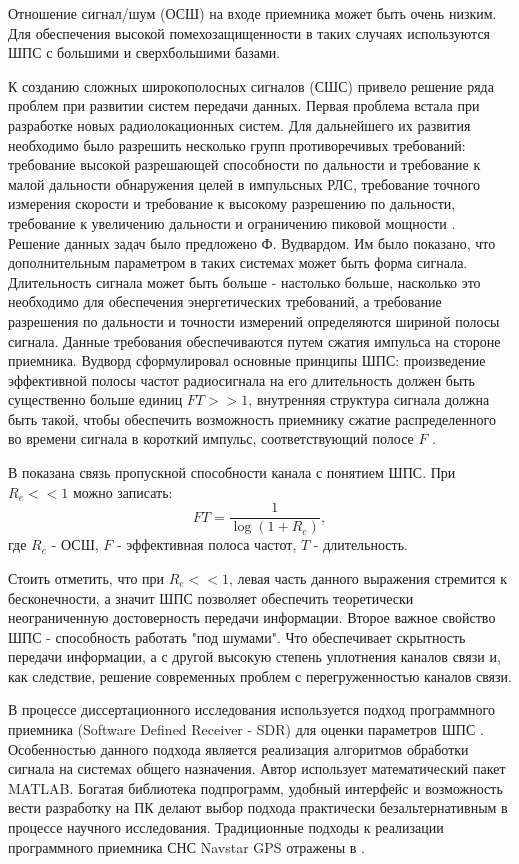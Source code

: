 Отношение сигнал/шум (ОСШ) на входе приемника может быть очень низким. Для обеспечения высокой помехозащищенности 
в таких случаях используются ШПС с большими и сверхбольшими базами.

К созданию сложных широкополосных сигналов (СШС) привело решение ряда проблем при развитии систем передачи данных.
Первая проблема встала при разработке новых радиолокационных систем. Для дальнейшего их развития необходимо было 
разрешить несколько групп противоречивых требований: требование высокой разрешающей способности по дальности и требование к малой дальности обнаружения
целей в импульсных РЛС, требование точного измерения скорости и требование к высокому разрешению по дальности, требование к
увеличению дальности и ограничению пиковой мощности \cite{gantmaher-book}. Решение данных задач было предложено
Ф. Вудвардом. Им было показано, что дополнительным параметром в таких системах может быть форма сигнала. Длительность сигнала
может быть больше - настолько больше, насколько это необходимо для обеспечения энергетических требований, а требование
разрешения по дальности и точности измерений определяются шириной полосы сигнала. Данные требования обеспечиваются
путем сжатия импульса на стороне приемника. Вудворд сформулировал основные принципы ШПС: произведение эффективной полосы частот
радиосигнала на его длительность должен быть существенно больше единиц ${FT>>1}$, внутренняя структура сигнала
должна быть такой, чтобы обеспечить возможность приемнику сжатие распределенного во времени сигнала в короткий импульс,
соответствующий полосе ${F}$ \cite{gantmaher-book}.

В \cite{gantmaher-book} показана связь пропускной способности канала с понятием ШПС. При ${R_e<<1}$ можно записать:
\begin{equation}
	FT = \frac{1}{\log(1+R_e)}, \nonumber
\end{equation}
где ${R_e}$ - ОСШ, ${F}$ - эффективная полоса частот, ${T}$ - длительность.

Стоить отметить, что при ${R_e<<1}$, левая часть данного выражения стремится к бесконечности, а значит
ШПС позволяет обеспечить теоретически неограниченную достоверность передачи информации. Второе важное свойство
ШПС - способность работать "под шумами". Что обеспечивает скрытность
передачи информации, а с другой высокую степень уплотнения каналов связи и, как следствие, решение современных проблем
с перегруженностью каналов связи.

В процессе диссертационного исследования используется подход программного приемника (Software Defined Receiver - SDR)
для оценки параметров ШПС \cite{akos-book, grayver-book, pany-book}. Особенностью данного подхода является реализация алгоритмов
обработки сигнала на системах общего назначения. Автор использует математический пакет MATLAB. Богатая библиотека подпрограмм, удобный интерфейс
и возможность вести разработку на ПК делают выбор подхода практически безальтернативным в процессе научного исследования.
Традиционные подходы к реализации программного приемника СНС Navstar GPS отражены в \cite{akos-book, tsui}. 

